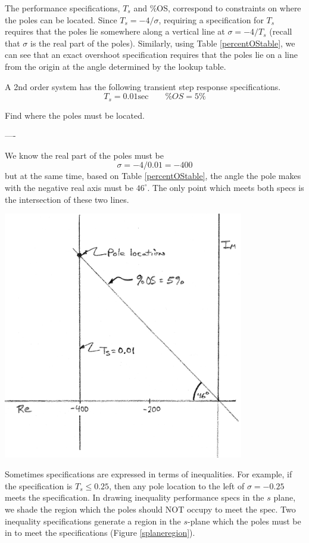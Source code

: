 The performance specifications, $T_s$ and \%OS,  correspond to constraints on where the poles can be located.
Since  $T_s = -4/\sigma$, requiring a  specification for $T_s$ requires that the poles lie somewhere along a vertical line at $\sigma = -4/T_s$ (recall that $\sigma$ is the real part of the poles).  Similarly, using  Table \ref{percentOStable}, we can see that an exact overshoot specification requires that the poles lie on a line from the origin at the angle determined by the lookup table.


\begin{ExampleSmall}
A 2nd order system has the following transient step response specifications.
\[
T_s = 0.01 \mathrm{sec} \qquad \%OS = 5\%
\]

Find where the poles must be located.

\vspace{0.1in}
----

We know the real part of the poles  must be
\[
\sigma = -4/0.01 = -400
\]
but at the same time, based on Table \ref{percentOStable}, the angle the pole makes with the negative real axis must be $46^\circ$.  The only point which meets both specs is the intersection of these two lines.

\includegraphics[width=105mm]{figs09/00787a.png}

\end{ExampleSmall}



Sometimes specifications are expressed in terms of inequalities.  For example, if the specification is $T_s \leq 0.25$, then any pole location to the left of $\sigma  = -0.25$ meets the specification.  In drawing inequality performance specs in the $s$ plane, we shade the region which the poles should NOT occupy to meet the spec.   Two inequality specifications generate a region in the $s$-plane which the poles must be in to meet the specifications (Figure \ref{splaneregion}).


